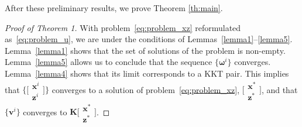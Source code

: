 \documentclass[10pt,twocolumn,twoside]{IEEEtran}
\newcommand{\x}{\mathbf{x}} %
\newcommand{\z}{\mathbf{z}} %
\newcommand{\vs}{\mathbf{v}} %
\newcommand{\D}{\mathbf{D}} %
\newcommand{\A}{\mathbf{A}} %
\newcommand{\B}{\mathbf{B}} %
\newcommand{\C}{\mathbf{C}} %
\newcommand{\I}{\mathbf{I}} %
\newcommand{\K}{\mathbf{K}} %
\newtheorem{theorem}{Theorem}
\begin{document}
After these preliminary results, we prove Theorem \ref{th:main}.%

%

\begin{proof}[Proof of Theorem 1]
	With problem~\eqref{eq:problem_xz} reformulated as~\eqref{eq:problem_u}, we are under the conditions of Lemmas~\ref{lemma1}--\ref{lemma5}. Lemma~\ref{lemma1} shows that the set of solutions of the problem is non-empty. Lemma~\ref{lemma5} allows us to conclude that the sequence $\{\bm{\omega}^i\}$ converges. Lemma~\ref{lemma4} shows that its limit corresponds to a KKT pair. This implies that $\big\{\big[\begin{smallmatrix} \x^i \\ \z^i \end{smallmatrix}\big]\big\}$ converges to a solution of problem~\eqref{eq:problem_xz}, $\big[\begin{smallmatrix} \x^* \\ \z^* \end{smallmatrix}\big]$, and that $\{\vs^i\}$ converges to $\K \big[\begin{smallmatrix} \x^* \\ \z^* \end{smallmatrix}\big]$.
\end{proof}
\end{document}
